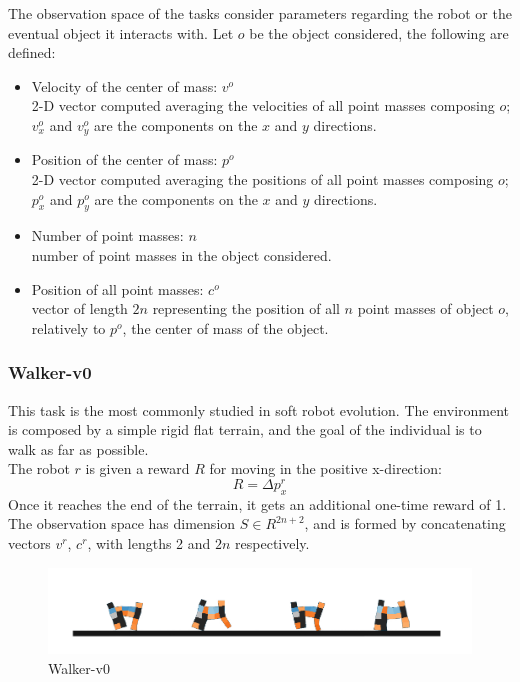 The observation space of the tasks consider parameters regarding the robot or the eventual object it interacts with.
Let $o$ be the object considered, the following are defined:
\begin{itemize}
    \item Velocity of the center of mass: $v^o$\\
        2-D vector computed averaging the velocities of all point masses composing $o$; $v^o_x$ and $v^o_y$ are the components on the $x$ and $y$ directions.
    \item Position of the center of mass: $p^o$\\
        2-D vector computed averaging the positions of all point masses composing $o$; $p^o_x$ and $p^o_y$ are the components on the $x$ and $y$ directions.
    \item Number of point masses: $n$\\
        number of point masses in the object considered.
    \item Position of all point masses: $c^o$\\
        vector of length $2n$ representing the position of all $n$ point masses of object $o$, relatively to $p^o$, the center of mass of the object.
\end{itemize}


\subsubsection{Walker-v0}
This task is the most commonly studied in soft robot evolution.
The environment is composed by a simple rigid flat terrain, and the goal of the individual is to walk as far as possible.\\
The robot $r$ is given a reward $R$ for moving in the positive x-direction:
\[R = \Delta p^r_x\]
Once it reaches the end of the terrain, it gets an additional one-time reward of 1.\\
The observation space has dimension $S \in R ^{2n+2}$, and is formed by concatenating vectors $v^r$, $c^r$, with lengths 2 and $2n$ respectively.

\begin{figure}[H]
    \centering
    \includegraphics[scale=0.9]{images/task_walker.pdf}
    \caption{Walker-v0}
    \label{fig:task_walker}
\end{figure}


